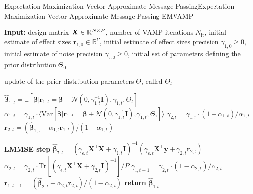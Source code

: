 \begin{breakablealgorithm}{Expectation-Maximization Vector Approximate Message Passing}{Expectation-Maximization Vector Approximate Message Passing \cite{LearningFreeEnergies2018}}{EMVAMP}
    \begin{algorithmic}[1]
        \STATE \parbox[t]{\dimexpr\linewidth-2\algorithmicindent}{%
        {\bfseries Input:} design matrix ${\boldsymbol X} \in \mathbb{R}^{N \times P}$, number of VAMP iterations $N_{\text{it}}$, initial estimate of effect sizes $\bm{r}_{1,0} \in \mathbb{R}^P$, initial estimate of effect sizes precision $\gamma_{1,0} \ge 0$, initial estimate of noise precision $\gamma_{\epsilon, 0} \ge 0$, initial set of parameters defining the prior distribution $\Theta_{0}$}
            \STATE {} update of the prior distribution parameters $\Theta$, called $\Theta_t$

            \STATE $\hat{\bm{\beta}}_{1,t} = \mathbb{E}[\bm{\beta} | \bm{r}_{1,t} = \bm{\beta} + \mathcal{N}(0, \gamma_{1,t}^{-1}\bm{I}), \gamma_{1,t}, \Theta_{t}]$
            \STATE $\alpha_{1,t} = \gamma_{1,t} \cdot \langle \text{Var}[\bm{\beta}|\bm{r}_{1,t} = \bm{\beta} + \mathcal{N}(0, \gamma_{1,t}^{-1}\bm{I}), \gamma_{1,t}, \Theta_{t}] \rangle$
            \STATE $\gamma_{2,t} = \gamma_{1,t} \cdot (1 - \alpha_{1,t}) / \alpha_{1,t}$ 
            \STATE $\bm{r}_{2,t} = (\hat{\bm{\beta}}_{1,t} - \alpha_{1,t} \bm{r}_{1,t}) / (1-\alpha_{1,t})$
            \item[]
            \STATE \textbf{LMMSE step}
            \STATE $\hat{\bm{\beta}}_{2,t} =  ( \gamma_{\epsilon,t} \bm{X}^\top\bm{X} + \gamma_{2,t} \bm{I} )^{-1} ( \gamma_{\epsilon,t} \bm{X}^\top \bm{y} + \gamma_{2,t} \bm{r}_{2,t} )$ 
            \STATE $\alpha_{2,t} = \gamma_{2,t} \cdot \text{Tr}[(\gamma_{\epsilon,t} \bm{X}^\top\bm{X} + \gamma_{2,t}\bm{I})^{-1}] / P$
            \STATE $\gamma_{1,t+1} = \gamma_{2,t} \cdot (1-\alpha_{2,t}) / \alpha_{2,t}$
            \STATE $\bm{r}_{1,t+1} = (\hat{\bm{\beta}}_{2,t} - \alpha_{2,t} \bm{r}_{2,t}) / (1-\alpha_{2,t})$ 
        \ENDFOR
        \STATE \textbf{return} $\hat{\bm{\beta}}_{1,t}$
    \end{algorithmic}
\end{breakablealgorithm}


